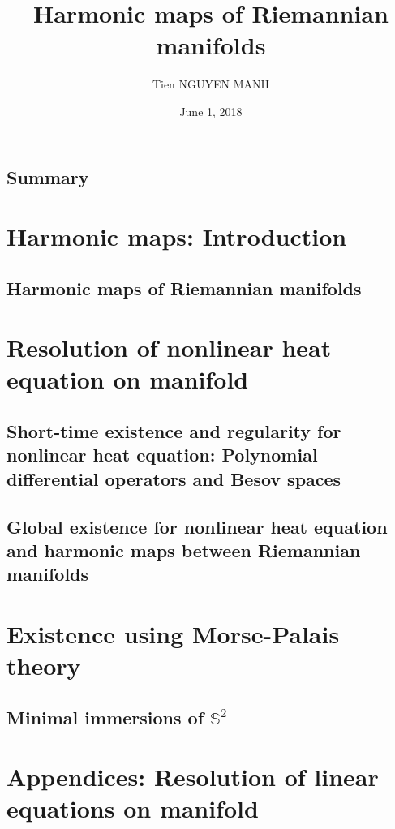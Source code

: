 \documentclass[11pt]{book}
\author{Tien NGUYEN MANH}
\date{June 1, 2018}
\title{Harmonic maps of Riemannian manifolds}
\begin{document}
\maketitle
\tableofcontents
\chapter{Summary}


\part{Harmonic maps: Introduction}
\chapter{Harmonic maps of Riemannian manifolds}


\part{Resolution of nonlinear heat equation on manifold}
\chapter[Short-time existence and regularity for nonlinear heat equation]{Short-time existence and regularity for nonlinear heat equation: Polynomial differential operators and Besov spaces}


\chapter[Global existence for nonlinear heat equation]{Global existence for nonlinear heat equation and harmonic maps between Riemannian manifolds}


\part{Existence using Morse-Palais theory}
\chapter{Minimal immersions of $\mathbb{S}^2$}


\part{Appendices: Resolution of linear equations on manifold}
\end{document}
